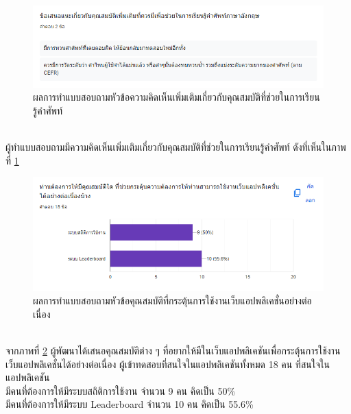 \documentclass[12pt,oneside,openright,a4paper]{cpe-thai-project}
\begin{document}
\begin{figure}[!h]\centering
	\includegraphics[width=\textwidth, keepaspectratio=true]{image/appendix/1st/extra 1.png}
	\caption{{ผลการทำแบบสอบถามหัวข้อความคิดเห็นเพิ่มเติมเกี่ยวกับคุณสมบัติที่ช่วยในการเรียนรู้คำศัพท์}}\label{fig:apdxExtraFeature1}
\end{figure}
\hspace{1cm}
\\ ผู้ทำแบบสอบถามมีความคิดเห็นเพิ่มเติมเกี่ยวกับคุณสมบัติที่ช่วยในการเรียนรู้คำศัพท์ ดังที่เห็นในภาพที่ \ref{fig:apdxExtraFeature1} 

\pagebreak
{}
\begin{figure}[!h]\centering
	\includegraphics[width=\textwidth, keepaspectratio=true]{image/appendix/1st/feature 2.png}
	\caption{{ผลการทำแบบสอบถามหัวข้อคุณสมบัติที่กระตุ้นการใช้งานเว็บแอปพลิเคชั่นอย่างต่อเนื่อง}}\label{fig:apdxFeature2}
\end{figure} 
\hspace{1cm}
\\ จากภาพที่ \ref{fig:apdxFeature2} ผู้พัฒนาได้เสนอคุณสมบัติต่าง ๆ ที่อยากให้มีในเว็บแอปพลิเคชันเพื่อกระตุ้นการใช้งานเว็บแอปพลิเคชั่นได้อย่างต่อเนื่อง 
ผู้เข้าทดสอบที่สนใจในแอปพลิเคชันทั้งหมด 18 คน ที่สนใจในแอปพลิเคชัน
\\มีคนที่ต้องการให้มีระบบสถิติการใช้งาน จำนวน 9 คน คิดเป็น 50\%
\\มีคนที่ต้องการให้มีระบบ Leaderboard จำนวน 10 คน คิดเป็น 55.6\%
\end{document}
